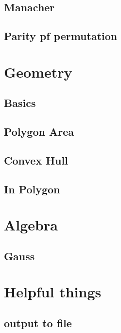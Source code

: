 \documentclass[a4paper,twocolumn]{extarticle}
\begin{document}
{        \subsection{Manacher}
        
        \subsection{Parity pf permutation}
        

        \section{Geometry}
        \subsection{Basics}
        
        \subsection{Polygon Area}
         
        \subsection{Convex Hull}
          
        \subsection{In Polygon}
         

        \section{Algebra}
        \subsection{Gauss}
        

        \section{Helpful things}
        \subsection{output to file}
         
}
\end{document}
